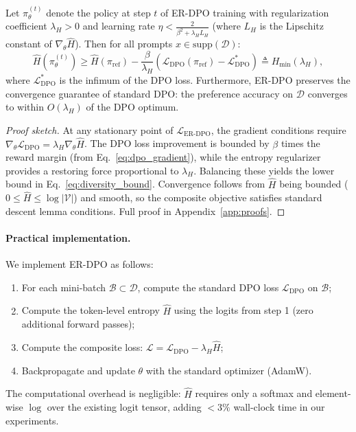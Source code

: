 \begin{theorem}
\label{thm:erdpo}
Let $\pi_\theta^{(t)}$ denote the policy at step $t$ of ER-DPO training with regularization coefficient $\lambda_H > 0$ and learning rate $\eta < \frac{2}{\beta^2 + \lambda_H L_H}$ (where $L_H$ is the Lipschitz constant of $\nabla_\theta \hat{H}$). Then for all prompts $x \in \text{supp}(\mathcal{D})$:
\begin{equation}
\label{eq:diversity_bound}
\hat{H}(\pi_\theta^{(t)}) \geq \hat{H}(\pi_{\text{ref}}) - \frac{\beta}{\lambda_H}\left(\mathcal{L}_{\text{DPO}}(\pi_{\text{ref}}) - \mathcal{L}_{\text{DPO}}^*\right) \triangleq H_{\min}(\lambda_H),
\end{equation}
where $\mathcal{L}_{\text{DPO}}^*$ is the infimum of the DPO loss. Furthermore, ER-DPO preserves the convergence guarantee of standard DPO: the preference accuracy on $\mathcal{D}$ converges to within $O(\lambda_H)$ of the DPO optimum.
\end{theorem}
\begin{proof}[Proof sketch]
At any stationary point of $\mathcal{L}_{\text{ER-DPO}}$, the gradient conditions require $\nabla_\theta \mathcal{L}_{\text{DPO}} = \lambda_H \nabla_\theta \hat{H}$. The DPO loss improvement is bounded by $\beta$ times the reward margin (from Eq.~\ref{eq:dpo_gradient}), while the entropy regularizer provides a restoring force proportional to $\lambda_H$. Balancing these yields the lower bound in Eq.~\eqref{eq:diversity_bound}. Convergence follows from $\hat{H}$ being bounded ($0 \leq \hat{H} \leq \log|\mathcal{V}|$) and smooth, so the composite objective satisfies standard descent lemma conditions. Full proof in Appendix~\ref{app:proofs}.
\end{proof}

\paragraph{Practical implementation.} We implement ER-DPO as follows:
\begin{enumerate}[leftmargin=*,itemsep=2pt]
    \item For each mini-batch $\mathcal{B} \subset \mathcal{D}$, compute the standard DPO loss $\mathcal{L}_{\text{DPO}}$ on $\mathcal{B}$;
    \item Compute the token-level entropy $\hat{H}$ using the logits from step 1 (zero additional forward passes);
    \item Compute the composite loss: $\mathcal{L} = \mathcal{L}_{\text{DPO}} - \lambda_H \hat{H}$;
    \item Backpropagate and update $\theta$ with the standard optimizer (AdamW).
\end{enumerate}
The computational overhead is negligible: $\hat{H}$ requires only a softmax and element-wise $\log$ over the existing logit tensor, adding $<3\%$ wall-clock time in our experiments.

